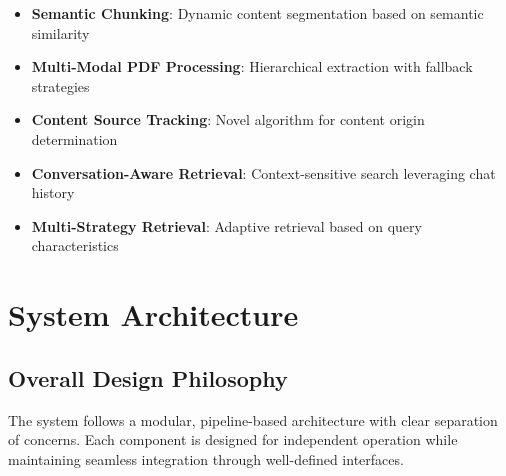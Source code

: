 \documentclass[10pt,a4paper,twocolumn]{article}
\begin{document}
\begin{itemize}[leftmargin=1em]
    \item \textbf{Semantic Chunking}: Dynamic content segmentation based on semantic similarity
    \item \textbf{Multi-Modal PDF Processing}: Hierarchical extraction with fallback strategies
    \item \textbf{Content Source Tracking}: Novel algorithm for content origin determination
    \item \textbf{Conversation-Aware Retrieval}: Context-sensitive search leveraging chat history
    \item \textbf{Multi-Strategy Retrieval}: Adaptive retrieval based on query characteristics
\end{itemize}

\section{System Architecture}

\subsection{Overall Design Philosophy}

The system follows a modular, pipeline-based architecture with clear separation of concerns. Each component is designed for independent operation while maintaining seamless integration through well-defined interfaces.
\end{document}
